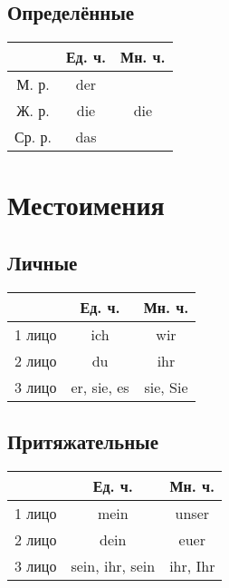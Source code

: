 \documentclass[oneside]{book}
\begin{document}
    \section{Определённые}
    \begin{center}
        \begin{tabular}{|c|c|c|}
            \hline
                   & Ед. ч. & Мн. ч.                \\ \hline
            М. р.  & der    & \multirow{3}{*}{die}  \\ \cline{1-2}
            Ж. р.  & die    &                       \\ \cline{1-2}
            Ср. р. & das    &                       \\ \hline
        \end{tabular}
    \end{center}

    \chapter{Местоимения}
    \section{Личные}
    \begin{center}
        \begin{tabular}{|c|c|c|}
            \hline
                   & Ед. ч.      & Мн. ч.   \\ \hline
            1 лицо & ich         & wir      \\ \hline
            2 лицо & du          & ihr      \\ \hline
            3 лицо & er, sie, es & sie, Sie \\ \hline
        \end{tabular}
    \end{center}

    \section{Притяжательные}
    \begin{center}
        \begin{tabular}{|c|c|c|}
            \hline
                   & Ед. ч.          & Мн. ч.   \\ \hline
            1 лицо & mein            & unser    \\ \hline
            2 лицо & dein            & euer     \\ \hline
            3 лицо & sein, ihr, sein & ihr, Ihr \\ \hline
        \end{tabular}
    \end{center}
\end{document}
